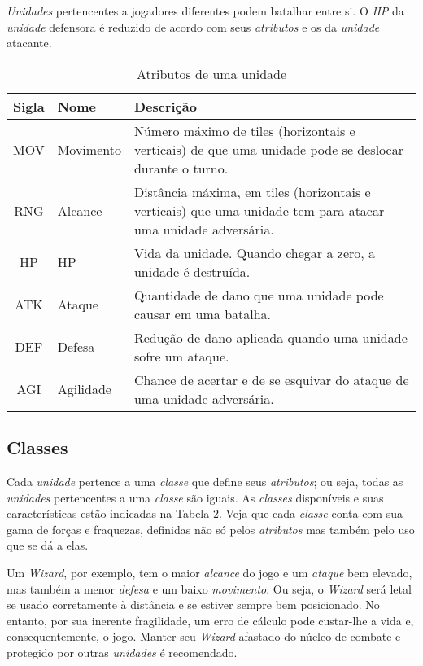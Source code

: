 \documentclass{article}
\begin{document}
\emph{Unidades} pertencentes a jogadores diferentes podem batalhar entre si. O \emph{HP} da \emph{unidade} defensora é reduzido de acordo com seus \emph{atributos} e os da \emph{unidade} atacante.

\begin{table}[H]
\centering
\begin{tabular}{|c|l|p{}|}\hline
 \textbf{Sigla} & \textbf{Nome} & \textbf{Descrição} \\\hline
 MOV & Movimento & Número máximo de tiles (horizontais e verticais) de que uma unidade pode se deslocar durante o turno. \\\hline
 RNG & Alcance   & Distância máxima, em tiles (horizontais e verticais) que uma unidade tem para atacar uma unidade adversária. \\\hline
 HP  & HP        & Vida da unidade. Quando chegar a zero, a unidade é destruída. \\\hline
 ATK & Ataque    & Quantidade de dano que uma unidade pode causar em uma batalha. \\\hline
 DEF & Defesa    & Redução de dano aplicada quando uma unidade sofre um ataque. \\\hline
 AGI & Agilidade & Chance de acertar e de se esquivar do ataque de uma unidade adversária. \\\hline
\end{tabular}
\caption{Atributos de uma unidade}
\end{table}

\subsection{Classes}
Cada \emph{unidade} pertence a uma \emph{classe} que define seus \emph{atributos}; ou seja, todas as \emph{unidades} pertencentes a uma \emph{classe} são iguais. As \emph{classes} disponíveis e suas características estão indicadas na Tabela 2. Veja que cada \emph{classe} conta com sua gama de forças e fraquezas, definidas não só pelos \emph{atributos} mas também pelo uso que se dá a elas. \par

Um \emph{Wizard}, por exemplo, tem o maior \emph{alcance} do jogo e um \emph{ataque} bem elevado, mas também a menor \emph{defesa} e um baixo \emph{movimento}. Ou seja, o \emph{Wizard} será letal se usado corretamente à distância e se estiver sempre bem posicionado. No entanto, por sua inerente fragilidade, um erro de cálculo pode custar-lhe a vida e, consequentemente, o jogo. Manter seu \emph{Wizard} afastado do núcleo de combate e protegido por outras \emph{unidades} é recomendado.
\end{document}
